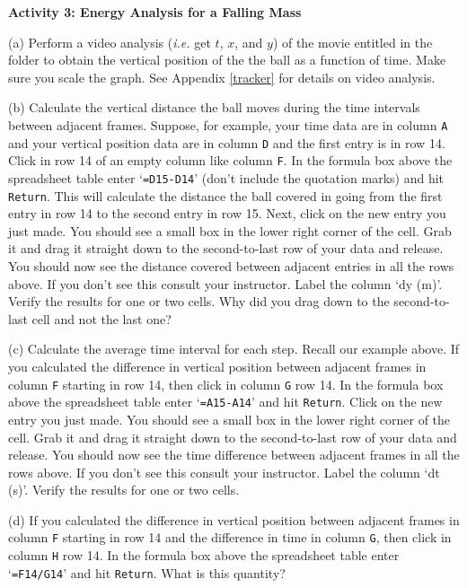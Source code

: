 \textbf{Activity 3: Energy Analysis for a Falling Mass}

(a) Perform a video analysis ({\it i.e.} get $t$, $x$, and $y$) of the movie entitled 
 in the \filename{\coursefolder} folder
to obtain the vertical position of the the ball as a function of time. 
Make sure you scale the graph.
See Appendix \ref{tracker} for details on video analysis.


(b) Calculate the vertical distance the ball moves during the time intervals between adjacent frames.
Suppose, for example, your time data are in column {\tt A} and your vertical position data are in 
column {\tt D} and the first entry is in row 14. 
Click in row 14 of an empty column like column {\tt F}.
In the formula box above the spreadsheet table enter `{\tt =D15-D14}' (don't include the quotation marks) 
and hit {\tt Return}.
This will calculate the distance the ball covered in going from the first entry in row 14 to the second entry 
in row 15.
Next, click on the new entry you just made. You should see a small box in the lower right corner of the cell.
Grab it and drag it straight down to the second-to-last row of your data and release.
You should now see the distance covered between adjacent entries in all the rows above. 
If you don't see this consult your instructor.
Label the column `dy (m)'.
Verify the results for one or two cells.
Why did you drag down to the second-to-last cell and not the last one?

\vspace{2.0cm}

(c) Calculate the average time interval for each step. Recall our example above.
If you calculated the difference in vertical position between adjacent frames in 
column {\tt F} starting in row 14, then
click in column {\tt G} row 14. 
In the formula box above the spreadsheet table enter `{\tt =A15-A14}' and hit {\tt Return}.
Click on the new entry you just made. You should see a small box in the lower right corner of the cell.
Grab it and drag it straight down to the second-to-last row of your data and release.
You should now see the time difference between adjacent frames in all the rows above. 
If you don't see this consult your instructor.
Label the column `dt (s)'.
Verify the results for one or two cells.

(d)  If you calculated the difference in vertical position between adjacent frames in 
column {\tt F} starting in row 14 and the difference in time in column {\tt G}, then
click in column {\tt H} row 14.
In the formula box above the spreadsheet table enter `{\tt =F14/G14}' and hit {\tt Return}.
What is this quantity?

